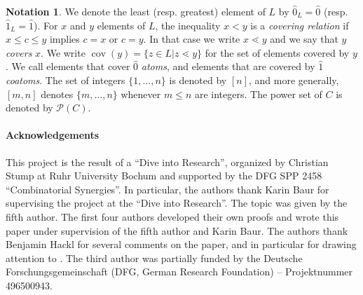 \documentclass{preprint}
\newcommand{\cov}{\operatorname{cov}}
\theoremstyle{definition}
\newtheorem*{notation*}{Notation}
\begin{document}
\begin{notation*}
We denote the least (resp.\! greatest) element of $L$ by $\hat{0}_L=\hat{0}$ (resp.\! $\hat{1}_L=\hat{1}$). For $x$ and $y$ elements of $L$, the inequality $x< y$ is a \emph{covering relation} if $x\leq c\leq y$ implies $c = x$ or $c = y$. In that case we write $x\lessdot y$ and we say that $y$ \emph{covers} $x$. We write $\cov(y) = \{z\in L | z\lessdot y\}$ for the set of elements covered by $y$. We call elements that cover $\hat{0}$ \emph{atoms}, and elements that are covered by $\hat{1}$ \emph{coatoms}. The set of integers $\{1, \dots, n\}$ is denoted by $[n]$, and more generally, $[m, n]$ denotes $\{m, \dots, n\}$ whenever $m\leq n$ are integers. The power set of $C$ is denoted by $\mathscr{P}(C)$. 
\end{notation*}

\paragraph{\textbf{Acknowledgements}} This project is the result of a ``Dive into Research'', organized by Christian Stump at Ruhr University Bochum and supported by the DFG SPP 2458 ``Combinatorial Synergies''. In particular, the authors thank Karin Baur for supervising the project at the ``Dive into Research''. The topic was given by the fifth author. The first four authors developed their own proofs and wrote this paper under supervision of the fifth author and Karin Baur. The authors thank Benjamin Hackl for several comments on the paper, and in particular for drawing attention to . The third author was partially funded by the Deutsche Forschungsgemeinschaft (DFG, German Research Foundation) -- Projektnummer 496500943.
\end{document}
